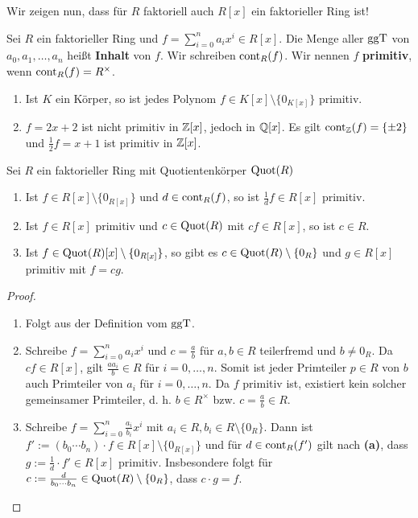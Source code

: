 Wir zeigen nun, dass für $R$ faktoriell auch $R[x]$ ein faktorieller Ring ist!
\begin{definition}\label{definition6_18}
	Sei $R$ ein faktorieller Ring und $f = \sum_{i=0}^n a_i x^i \in R[x]$. Die Menge aller $\mathrm{ggT}$ von $a_0, a_1, \dots, a_n$ heißt \textbf{Inhalt} von $f$. Wir schreiben $\mathrm{cont}_R(f)$. Wir nennen $f$ \textbf{primitiv}, wenn $\mathrm{cont}_R(f) = R^\times$.
\end{definition}
\begin{beispiel}\label{beispiel6_19}
	\begin{enumerate}[label=(\arabic*)]
		\item Ist $K$ ein Körper, so ist jedes Polynom $f \in K[x]\setminus\{0_{K[x]}\}$ primitiv.
		\item $f = 2x + 2$ ist nicht primitiv in $\mathbb{Z}[x]$, jedoch in $\mathbb{Q}[x]$. Es gilt $\mathrm{cont}_{\mathbb{Z}} (f) = \{\pm 2\}$ und $\frac{1}{2}f = x + 1$ ist primitiv in $\mathbb{Z}[x]$.
	\end{enumerate}
\end{beispiel}
\begin{lem}\label{lem6_20}
	Sei $R$ ein faktorieller Ring mit Quotientenkörper $\mathrm{Quot}(R)$
	\begin{enumerate}[label=(\alph*)]
		\item Ist $f \in R[x]\setminus\{0_{R[x]}\}$ und $d \in \mathrm{cont}_R(f)$, so ist $\frac{1}{d} f \in R[x]$ primitiv.
		\item Ist $f \in R[x]$ primitiv und $c \in \mathrm{Quot}(R)$ mit $cf \in R[x]$, so ist $c \in R$.
		\item Ist $f \in \mathrm{Quot}(R)[x]\setminus \{0_{R[x]}\}$, so gibt es $c \in \mathrm{Quot}(R) \setminus \{0_{R}\}$ und $g \in R[x]$ primitiv mit $f = cg$.
	\end{enumerate}
\end{lem}
\begin{proof}
	\begin{enumerate}[label=(\alph*)]
		\item Folgt aus der Definition vom $\mathrm{ggT}$.
		\item Schreibe $f = \sum_{i=0}^n a_i x^i$ und $c = \frac{a}{b}$ für $a,b \in R$ teilerfremd und $b \neq 0_R$. Da $cf \in R[x]$, gilt $\frac{a a_i}{b} \in R$ für $i = 0,\dots, n$. Somit ist jeder Primteiler $p \in R$ von $b$ auch Primteiler von $a_i$ für $i = 0,\dots,n$. Da $f$ primitiv ist, existiert kein solcher gemeinsamer Primteiler, d. h. $b \in R^\times$ bzw. $c =\frac{a}{b} \in R$.
		\item Schreibe $f = \sum_{i=0}^n \frac{a_i}{b_i} x^i$ mit $a_i \in R, b_i \in R\setminus \{0_R\}$. Dann ist $f' := (b_0 \cdots b_n)\cdot f \in R[x] \setminus\{0_{R[x]}\}$ und für $d \in \mathrm{cont}_R(f')$ gilt nach \textbf{(a)}, dass $g := \frac{1}{d} \cdot f' \in R[x]$ primitiv. Insbesondere folgt für $c := \frac{d}{b_0 \cdots b_n} \in \mathrm{Quot}(R)\setminus \{0_R\}$, dass $c \cdot g = f$.
	\end{enumerate}
\end{proof}
